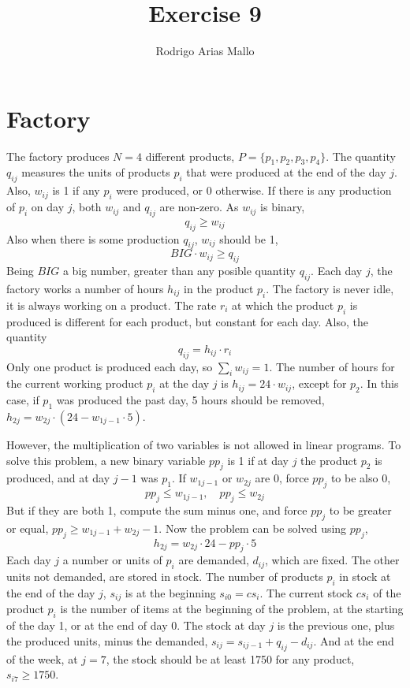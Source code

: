\documentclass[11pt,a4paper]{article}
\title{Exercise 9}
\author{Rodrigo Arias Mallo}
\begin{document}
\maketitle

\section*{Factory}

The factory produces $N=4$ different products, $P = \{p_1, p_2, p_3, p_4 \}$.  
The quantity $q_{ij}$ measures the units of products $p_i$ that were produced at 
the end of the day $j$. Also, $w_{ij}$ is 1 if any $p_i$ were produced, or 0 
otherwise. If there is any production of $p_i$ on day $j$, both $w_{ij}$ and 
$q_{ij}$ are non-zero. As $w_{ij}$ is binary,
%
$$ q_{ij} \ge w_{ij} $$
%
Also when there is some production $q_{ij}$, $w_{ij}$ should be 1,
%
$$ BIG \cdot w_{ij} \ge q_{ij} $$
%
Being $BIG$ a big number, greater than any posible quantity $q_{ij}$. Each day 
$j$, the factory works a number of hours $h_{ij}$ in the product $p_i$.  The 
factory is never idle, it is always working on a product. The rate $r_i$ at 
which the product $p_i$ is produced is different for each product, but constant 
for each day. Also, the quantity
%
$$ q_{ij} = h_{ij} \cdot r_i $$
%
Only one product is produced each day, so $ \sum_i w_{ij} = 1 $. The number of 
hours for the current working product $p_i$ at the day $j$ is $h_{ij} = 
24 \cdot w_{ij}$, except for $p_2$. In this case, if $p_1$ was produced the past 
	 day, 5 hours should be removed, $h_{2j} = w_{2j} \cdot (24 - w_{1 j-1} \cdot 
	 5)$.

However, the multiplication of two variables is not allowed in linear programs. 
To solve this problem, a new binary variable $pp_j$ is 1 if at day $j$ the product 
$p_2$ is produced, and at day $j-1$ was $p_1$. If $w_{1j-1}$ or $w_{2j}$ are 0, force 
$pp_j$ to be also 0,
%
$$ pp_j \le w_{1j-1}, \quad pp_j \le w_{2j} $$
%
But if they are both 1, compute the sum minus one, and force $pp_j$ to be 
greater or equal, $ pp_j \ge w_{1j-1} + w_{2j} - 1 $. Now the problem can be 
solved using $pp_j$, $$h_{2j} = w_{2j} \cdot 24 - pp_j \cdot 5$$
%
Each day $j$ a number or units of $p_i$ are demanded, $d_{ij}$, which are fixed.  
The other units not demanded, are stored in stock. The number of products $p_i$ 
in stock at the end of the day $j$, $s_{ij}$ is at the beginning $s_{i0} = 
cs_i$.  The current stock $cs_i$ of the product $p_i$ is the number of items at 
the beginning of the problem, at the starting of the day 1, or at the end of day 
0. The stock at day $j$ is the previous one, plus the produced units, minus the 
	 demanded, $s_{ij} = s_{ij-1} + q_{ij} - d_{ij}$. And at the end of the week, 
	 at $j=7$, the stock should be at least 1750 for any product, $s_{i7} \ge 
	 1750$.
\end{document}
